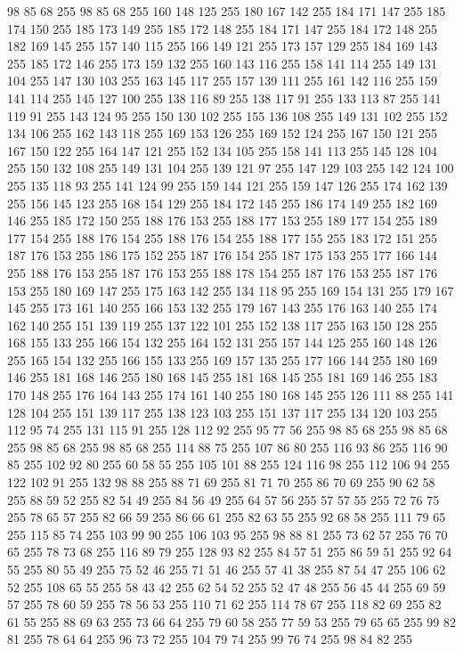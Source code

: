 98 85 68 255 98 85 68 255 160 148 125 255 180 167 142 255 184 171 147 255 185 174 150 255 185 173 149 255 185 172 148 255 184 171 147 255 184 172 148 255 182 169 145 255 157 140 115 255 166 149 121 255 173 157 129 255 184 169 143 255 185 172 146 255 173 159 132 255 160 143 116 255 158 141 114 255 149 131 104 255 147 130 103 255 163 145 117 255 157 139 111 255 161 142 116 255 159 141 114 255 145 127 100 255 138 116 89 255 138 117 91 255 133 113 87 255 141 119 91 255 143 124 95 255 150 130 102 255 155 136 108 255 149 131 102 255 152 134 106 255 162 143 118 255 169 153 126 255 169 152 124 255 167 150 121 255 167 150 122 255 164 147 121 255 152 134 105 255 158 141 113 255 145 128 104 255 150 132 108 255 149 131 104 255 139 121 97 255 147 129 103 255 142 124 100 255 135 118 93 255 141 124 99 255 159 144 121 255 159 147 126 255 174 162 139 255 156 145 123 255 168 154 129 255 184 172 145 255 186 174 149 255 182 169 146 255 185 172 150 255 188 176 153 255 188 177 153 255 189 177 154 255 189 177 154 255
188 176 154 255 188 176 154 255 188 177 155 255 183 172 151 255 187 176 153 255 186 175 152 255 187 176 154 255 187 175 153 255 177 166 144 255 188 176 153 255 187 176 153 255 188 178 154 255 187 176 153 255 187 176 153 255 180 169 147 255 175 163 142 255 134 118 95 255 169 154 131 255 179 167 145 255 173 161 140 255 166 153 132 255 179 167 143 255 176 163 140 255 174 162 140 255 151 139 119 255 137 122 101 255 152 138 117 255 163 150 128 255 168 155 133 255 166 154 132 255 164 152 131 255 157 144 125 255 160 148 126 255 165 154 132 255 166 155 133 255 169 157 135 255 177 166 144 255 180 169 146 255 181 168 146 255 180 168 145 255 181 168 145 255 181 169 146 255 183 170 148 255 176 164 143 255 174 161 140 255 180 168 145 255 126 111 88 255 141 128 104 255 151 139 117 255 138 123 103 255 151 137 117 255 134 120 103 255 112 95 74 255 131 115 91 255 128 112 92 255 95 77 56 255 98 85 68 255 98 85 68 255 98 85 68 255 98 85 68 255 114 88 75 255 107 86 80 255 116 93 86 255 116 90 85 255
102 92 80 255 60 58 55 255 105 101 88 255 124 116 98 255 112 106 94 255 122 102 91 255 132 98 88 255 88 71 69 255 81 71 70 255 86 70 69 255 90 62 58 255 88 59 52 255 82 54 49 255 84 56 49 255 64 57 56 255 57 57 55 255 72 76 75 255 78 65 57 255 82 66 59 255 86 66 61 255 82 63 55 255 92 68 58 255 111 79 65 255 115 85 74 255 103 99 90 255 106 103 95 255 98 88 81 255 73 62 57 255 76 70 65 255 78 73 68 255 116 89 79 255 128 93 82 255 84 57 51 255 86 59 51 255 92 64 55 255 80 55 49 255 75 52 46 255 71 51 46 255 57 41 38 255 87 54 47 255 106 62 52 255 108 65 55 255 58 43 42 255 62 54 52 255 52 47 48 255 56 45 44 255 69 59 57 255 78 60 59 255 78 56 53 255 110 71 62 255 114 78 67 255 118 82 69 255 82 61 55 255 88 69 63 255 73 66 64 255 79 60 58 255 77 59 53 255 79 65 65 255 99 82 81 255 78 64 64 255 96 73 72 255 104 79 74 255 99 76 74 255 98 84 82 255
